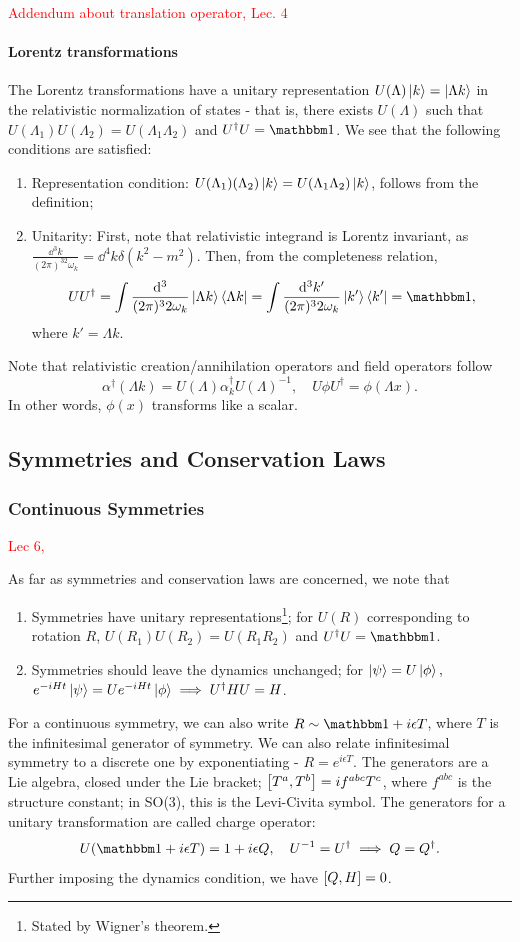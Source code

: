 \documentclass{article}
\begin{document}
\textcolor{red}{Addendum about translation operator, Lec. 4}

\paragraph{Lorentz transformations}

The Lorentz transformations have a unitary representation $U(\Lambda)\ket k=\ket{\Lambda k}$ in the relativistic normalization of states - that is, there exists $U(\Lambda)$ such that $U(\Lambda_1)U(\Lambda_2)=U(\Lambda_1\Lambda_2)$ and $U^\dag U=\mathbbm 1$. We see that the following conditions are satisfied:
\begin{enumerate}
    \item Representation condition: $U(\Lambda_1)(\Lambda_2)\ket k=U(\Lambda_1\Lambda_2)\ket k$, follows from the definition;
    \item Unitarity: First, note that relativistic integrand is Lorentz invariant, as $\frac{\dd^3k}{(2\pi)^32\omega_k}=\dd^4k\delta(k^2-m^2)$. Then, from the completeness relation, 
    $$UU^\dag=\int\frac{\dd^3}{(2\pi)^32\omega_k}\ket{\Lambda k}\bra{\Lambda k}=\int\frac{\dd^3k'}{(2\pi)^32\omega_k}\ket{k'}\bra{k'}=\mathbbm 1,$$
    where $k'=\Lambda k$. 
\end{enumerate}
Note that relativistic creation/annihilation operators and field operators follow
$$\alpha^\dag(\Lambda k)=U(\Lambda)\alpha^\dag_kU(\Lambda)^{-1},\quad U\phi U^\dag=\phi(\Lambda x).$$
In other words, $\phi(x)$ transforms like a scalar.

\subsection{Symmetries and Conservation Laws}
\subsubsection{Continuous Symmetries}
\textcolor{red}{Lec 6, }

As far as symmetries and conservation laws are concerned, we note that
\begin{enumerate}
    \item Symmetries have unitary representations\footnote{Stated by Wigner's theorem. }; for $U(R)$ corresponding to rotation $R$, $U(R_1)U(R_2)=U(R_1R_2)$ and $U^\dag U=\mathbbm 1$.
    \item Symmetries should leave the dynamics unchanged; for $\ket\psi=U\ket\phi,$ $e^{-iHt}\ket{\psi}=Ue^{-iHt}\ket\phi\implies U^\dag HU=H$.
\end{enumerate}
For a continuous symmetry, we can also write $R\sim\mathbbm 1+i\epsilon T$, where $T$ is the infinitesimal generator of symmetry. We can also relate infinitesimal symmetry to a discrete one by exponentiating - $R=e^{i\epsilon T}$. The generators are a Lie algebra, closed under the Lie bracket; $\comm{T^a}{T^b}=if^{abc}T^c$, where $f^{abc}$ is the structure constant; in SO(3), this is the Levi-Civita symbol. The generators for a unitary transformation are called charge operator:
$$U(\mathbbm 1+i\epsilon T)=1+i\epsilon Q,\quad U^{-1}=U^\dag\implies Q=Q^\dag.$$
Further imposing the dynamics condition, we have $\comm{Q}{H}=0$. 
\end{document}
